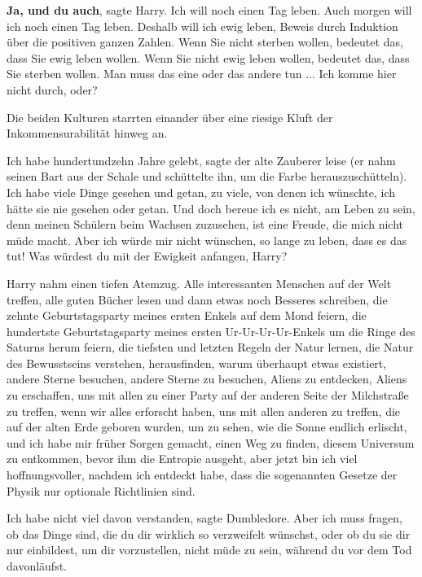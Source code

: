 \glqq{}\textbf{Ja, und du auch}\grqq{}, sagte Harry. \glqq{}Ich will noch einen
Tag leben. Auch morgen will ich noch einen Tag leben. Deshalb will ich ewig
leben, Beweis durch Induktion über die positiven ganzen Zahlen. Wenn Sie nicht
sterben wollen, bedeutet das, dass Sie ewig leben wollen. Wenn Sie nicht ewig
leben wollen, bedeutet das, dass Sie sterben wollen. Man muss das eine oder das
andere tun ... Ich komme hier nicht durch, oder?\grqq{}

Die beiden Kulturen starrten einander über eine riesige Kluft der
Inkommensurabilität hinweg an.

\glqq{}Ich habe hundertundzehn Jahre gelebt\grqq{}, sagte der alte Zauberer leise
(er nahm seinen Bart aus der Schale und schüttelte ihn, um die Farbe
herauszuschütteln). \glqq{}Ich habe viele Dinge gesehen und getan, zu viele, von
denen ich wünschte, ich hätte sie nie gesehen oder getan. Und doch bereue ich es
nicht, am Leben zu sein, denn meinen Schülern beim Wachsen zuzusehen, ist eine
Freude, die mich nicht müde macht. Aber ich würde mir nicht wünschen, so lange
zu leben, dass es das tut! Was würdest du mit der Ewigkeit anfangen,
Harry?\grqq{}

Harry nahm einen tiefen Atemzug. \glqq{}Alle interessanten Menschen auf der Welt
treffen, alle guten Bücher lesen und dann etwas noch Besseres schreiben, die
zehnte Geburtstagsparty meines ersten Enkels auf dem Mond feiern, die hundertste
Geburtstagsparty meines ersten Ur-Ur-Ur-Ur-Enkels um die Ringe des Saturns herum
feiern, die tiefsten und letzten Regeln der Natur lernen, die Natur des
Bewusstseins verstehen, herausfinden, warum überhaupt etwas existiert, andere
Sterne besuchen, andere Sterne zu besuchen, Aliens zu entdecken, Aliens zu
erschaffen, uns mit allen zu einer Party auf der anderen Seite der Milchstraße
zu treffen, wenn wir alles erforscht haben, uns mit allen anderen zu treffen,
die auf der alten Erde geboren wurden, um zu sehen, wie die Sonne endlich
erlischt, und ich habe mir früher Sorgen gemacht, einen Weg zu finden, diesem
Universum zu entkommen, bevor ihm die Entropie ausgeht, aber jetzt bin ich viel
hoffnungsvoller, nachdem ich entdeckt habe, dass die sogenannten Gesetze der
Physik nur optionale Richtlinien sind.\grqq{}

\glqq{}Ich habe nicht viel davon verstanden\grqq{}, sagte Dumbledore. \glqq{}Aber
ich muss fragen, ob das Dinge sind, die du dir wirklich so verzweifelt wünschst,
oder ob du sie dir nur einbildest, um dir vorzustellen, nicht müde zu sein,
während du vor dem Tod davonläufst.\grqq{}


